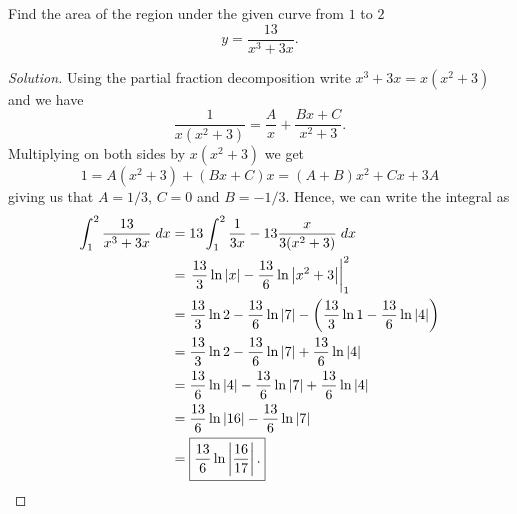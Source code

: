 \begin{problem}[WebAssign, HW 14, \# 5]
Find the area of the region under the given curve from $1$ to $2$
\[
y=\frac{13}{x^3+3x}.
\]
\end{problem}
\begin{proof}[Solution]
Using the partial fraction decomposition write $x^3+3x=x(x^2+3)$ and we
have
\[
\frac{1}{x(x^2+3)}=\frac{A}{x}+\frac{Bx+C}{x^2+3}.
\]
Multiplying on both sides by $x(x^2+3)$ we get
\[
1=A(x^2+3)+(Bx+C)x=(A+B)x^2+Cx+3A
\]
giving us that $A=1/3$, $C=0$ and $B=-1/3$. Hence, we can write the
integral as
\begin{align*}
\int_1^2\frac{13}{x^3+3x}\;dx
&=13\int_1^2\frac{1}{3x}-13\frac{x}{3(x^2+3)}\;dx\\
&=\left.\frac{13}{3}\ln|x|-\frac{13}{6}\ln\left|x^2+3\right|\right|_1^2\\
&=\frac{13}{3}\ln 2-\frac{13}{6}\ln|7|
-\left(\frac{13}{3}\ln 1-\frac{13}{6}\ln|4|\right)\\
&=\frac{13}{3}\ln 2-\frac{13}{6}\ln|7|+\frac{13}{6}\ln|4|\\
&=\frac{13}{6}\ln|4|-\frac{13}{6}\ln|7|+\frac{13}{6}\ln|4|\\
&=\frac{13}{6}\ln|16|-\frac{13}{6}\ln|7|\\
&=\boxed{\frac{13}{6}\ln\left|\frac{16}{17}\right|.}\qedhere
\end{align*}
\end{proof}

